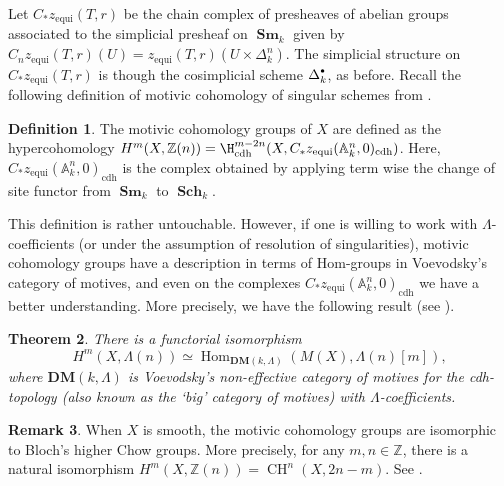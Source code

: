 \documentclass[JEP,XML,SOM,Unicode,published]{cedram}
\newcommand{\sbullet}{{\scriptscriptstyle\bullet}}
\newcommand{\csbullet}{{\raisebox{1pt}{$\sbullet$}}}
\newcommand{\cdh}{\mathrm{cdh}}
\newcommand{\equi}{\mathrm{equi}}
\newtheorem{thm}{Theorem}[section]
\theoremstyle{definition}
\newtheorem{defn}[thm]{Definition}
\newtheorem{remk}[thm]{Remark}
\newcommand{\A}{{\mathbb A}}
\newcommand{\Z}{{\mathbb Z}}
\DeclareMathOperator{\CH}{CH}
\DeclareMathOperator{\Hom}{Hom}
\DeclareMathOperator{\Sch}{\mathbf{Sch}}
\DeclareMathOperator{\Sm}{\mathbf{Sm}}
\begin{document}
Let $C_{\ast}z_{\equi}(T,r)$ be the chain complex of
presheaves of abelian groups associated to
the simplicial presheaf on $\Sm_k$ given by
$C_nz_{\equi}(T,r)(U) = z_{\equi}(T,r)(U \times \Delta^n_k)$.
The simplicial structure on $C_{\ast}z_{\equi}(T,r)$
is though the cosimplicial scheme $\Delta^{\csbullet}_k$, as before.
Recall the following definition of motivic cohomology of singular schemes
from \cite[Def.\,9.2]{FV}.

\begin{defn}\label{defn:MC-sing}
The motivic cohomology groups of $X$ are defined as the
hypercohomology
$H^m(X, \Z(n)) = \H^{m-2n}_{\cdh}(X, C_{\ast}z_{\equi}(\A^n_k,0)_{\cdh})$. Here, $C_{\ast}z_{\equi}(\A^n_k,0)_{\cdh}$ is the complex obtained by applying term wise the change of site functor from $\Sm_k$ to $\Sch_k$.
\end{defn}

This definition is rather untouchable. However, if one is willing to work with $\Lambda$\nobreakdash-coefficients (or under the assumption of resolution of singularities), motivic cohomology groups have a description in terms of Hom-groups in Voevodsky's category of motives, and even on the complexes $C_{\ast}z_{\equi}(\A^n_k,0)_{\cdh}$ we have a better understanding. More precisely, we have the following result (see \cite[Th.\,3.10]{KP}).
\begin{thm} There is a functorial
isomorphism \[H^m(X, \Lambda(n)) \simeq \Hom_{\mathbf{DM}(k, \Lambda)}(M(X), \Lambda(n)[m]),\] where
$\mathbf{DM}(k, \Lambda)$ is Voevodsky's non-effective category of motives for the cdh-topology (also known as the `big' category of motives) with $\Lambda$-coefficients.
\end{thm}

\begin{remk}
When $X$ is smooth, the motivic cohomology groups are isomorphic to Bloch's higher Chow groups. More precisely, for any $m,n\in \Z$, there is a natural isomorphism $H^m(X, \Z(n)) = \CH^n(X, 2n-m)$. See
\cite[Cor. 2]{VoevHigherChow}.
\end{remk}
\end{document}
